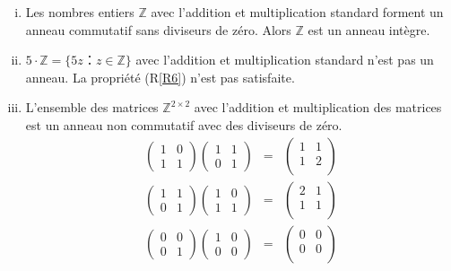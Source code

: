 \begin{example}
  \label{exe:32}
  \begin{enumerate}[i)]
  \item Les nombres entiers $ℤ$ avec l'addition et multiplication standard forment un anneau commutatif sans diviseurs de zéro. Alors $ℤ$ est un anneau intègre. 
  \item $5 ⋅ℤ = \{ 5 z ：z ∈ ℤ\}$ avec l'addition et multiplication standard n'est pas un anneau. La propriété (R\ref{R6}) n'est pas satisfaite.
  \item L'ensemble des matrices  $ℤ^{2 ×2}$ avec l'addition et multiplication des matrices est un anneau non commutatif avec des diviseurs de zéro. 
    \begin{eqnarray*}
      \begin{pmatrix}
        1 & 0 \\
        1 & 1 
      \end{pmatrix}
       \begin{pmatrix}
        1 & 1 \\
         0& 1 
       \end{pmatrix}   & = &
                            \begin{pmatrix}
                               1 & 1 \\
                               1 & 2 \\
                             \end{pmatrix}  \\      
      \begin{pmatrix}
        1 & 1 \\
        0 & 1 
      \end{pmatrix}
       \begin{pmatrix}
        1 & 0 \\
         1 & 1 
       \end{pmatrix}   & = &
                            \begin{pmatrix}
                               2 & 1 \\
                               1 & 1 \\
                             \end{pmatrix}       
    \end{eqnarray*}
     \begin{eqnarray*}
      \begin{pmatrix}
        0 & 0 \\
        0 & 1 
      \end{pmatrix}
       \begin{pmatrix}
        1 & 0 \\
         0& 0 
       \end{pmatrix}   & = &
                            \begin{pmatrix}
                               0 & 0 \\
                               0 & 0 \\
                             \end{pmatrix}  
     \end{eqnarray*}
   \end{enumerate}
\end{example}

